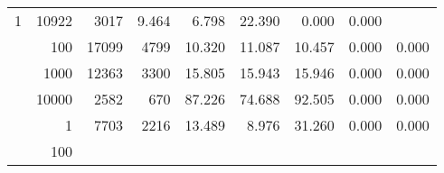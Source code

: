 \begin{table}
\begin{tabular}{rrrrrrrrr}
					
					 
					\multirow{ 1 }{*}{ 1 } &
					
						
							    
							     10922  & 3017  
	                           & 9.464 & 6.798 & 22.390
	                           & 0.000 & 0.000  \\
	                
	            
					 &  
					 
					\multirow{ 1 }{*}{ 100 } &
					
						
							    
							     17099  & 4799  
	                           & 10.320 & 11.087 & 10.457
	                           & 0.000 & 0.000  \\
	                
	            
					 &  
					 
					\multirow{ 1 }{*}{ 1000 } &
					
						
							    
							     12363  & 3300  
	                           & 15.805 & 15.943 & 15.946
	                           & 0.000 & 0.000  \\
	                
	            
					 &  
					 
					\multirow{ 1 }{*}{ 10000 } &
					
						
							    
							     2582  & 670  
	                           & 87.226 & 74.688 & 92.505
	                           & 0.000 & 0.000  \\
	                
	            
	        
				\noalign{\smallskip}\hline
				\multirow{ 4 }{*}{ 2000000 } &
				
					
					 
					\multirow{ 1 }{*}{ 1 } &
					
						
							    
							     7703  & 2216  
	                           & 13.489 & 8.976 & 31.260
	                           & 0.000 & 0.000  \\
	                
	            
					 &  
					 
					\multirow{ 1 }{*}{ 100 } &
					
						
							    

\end{tabular}
\end{table}
